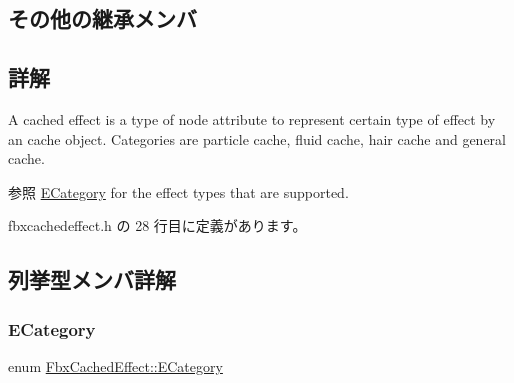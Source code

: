 \subsection*{その他の継承メンバ}


\subsection{詳解}
A cached effect is a type of node attribute to represent certain type of effect by an cache object. Categories are particle cache, fluid cache, hair cache and general cache. \begin{DoxySeeAlso}{参照}
\hyperlink{class_fbx_cached_effect_ab402402f3e66d6e31eb3002b0bd58c33}{E\+Category} for the effect types that are supported. 
\end{DoxySeeAlso}


 fbxcachedeffect.\+h の 28 行目に定義があります。



\subsection{列挙型メンバ詳解}
\mbox{\label{class_fbx_cached_effect_ab402402f3e66d6e31eb3002b0bd58c33}} 
\subsubsection{\texorpdfstring{E\+Category}{ECategory}}
{\footnotesize\ttfamily enum \hyperlink{class_fbx_cached_effect_ab402402f3e66d6e31eb3002b0bd58c33}{Fbx\+Cached\+Effect\+::\+E\+Category}}

